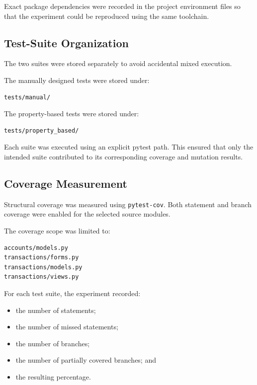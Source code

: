 \documentclass[12pt]{article}
\begin{document}
Exact package dependencies were recorded in the project environment files so
that the experiment could be reproduced using the same toolchain.

\subsection{Test-Suite Organization}

The two suites were stored separately to avoid accidental mixed execution.

The manually designed tests were stored under:

\begin{verbatim}
tests/manual/
\end{verbatim}

The property-based tests were stored under:

\begin{verbatim}
tests/property_based/
\end{verbatim}

Each suite was executed using an explicit pytest path. This ensured that only
the intended suite contributed to its corresponding coverage and mutation
results.

\subsection{Coverage Measurement}

Structural coverage was measured using \texttt{pytest-cov}. Both statement and
branch coverage were enabled for the selected source modules.

The coverage scope was limited to:

\begin{verbatim}
accounts/models.py
transactions/forms.py
transactions/models.py
transactions/views.py
\end{verbatim}

For each test suite, the experiment recorded:

\begin{itemize}
    \item the number of statements;
    \item the number of missed statements;
    \item the number of branches;
    \item the number of partially covered branches; and
    \item the resulting percentage.
\end{itemize}
\end{document}
